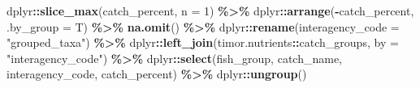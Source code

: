 \documentclass[
]{book}
\newenvironment{Shaded}{\begin{snugshade}}{\end{snugshade}}
\newcommand{\AttributeTok}[1]{\textcolor[rgb]{0.13,0.29,0.53}{#1}}
\newcommand{\DecValTok}[1]{\textcolor[rgb]{0.00,0.00,0.81}{#1}}
\newcommand{\FunctionTok}[1]{\textcolor[rgb]{0.13,0.29,0.53}{\textbf{#1}}}
\newcommand{\NormalTok}[1]{#1}
\newcommand{\SpecialCharTok}[1]{\textcolor[rgb]{0.81,0.36,0.00}{\textbf{#1}}}
\newcommand{\StringTok}[1]{\textcolor[rgb]{0.31,0.60,0.02}{#1}}
\begin{document}
\begin{Shaded}
\begin{Highlighting}[]
\NormalTok{  dplyr}\SpecialCharTok{::}\FunctionTok{slice\_max}\NormalTok{(catch\_percent, }\AttributeTok{n =} \DecValTok{1}\NormalTok{) }\SpecialCharTok{\%\textgreater{}\%}
\NormalTok{  dplyr}\SpecialCharTok{::}\FunctionTok{arrange}\NormalTok{(}\SpecialCharTok{{-}}\NormalTok{catch\_percent, }\AttributeTok{.by\_group =}\NormalTok{ T) }\SpecialCharTok{\%\textgreater{}\%}
  \FunctionTok{na.omit}\NormalTok{() }\SpecialCharTok{\%\textgreater{}\%}
\NormalTok{  dplyr}\SpecialCharTok{::}\FunctionTok{rename}\NormalTok{(}\AttributeTok{interagency\_code =} \StringTok{"grouped\_taxa"}\NormalTok{) }\SpecialCharTok{\%\textgreater{}\%}
\NormalTok{  dplyr}\SpecialCharTok{::}\FunctionTok{left\_join}\NormalTok{(timor.nutrients}\SpecialCharTok{::}\NormalTok{catch\_groups, }\AttributeTok{by =} \StringTok{"interagency\_code"}\NormalTok{) }\SpecialCharTok{\%\textgreater{}\%}
\NormalTok{  dplyr}\SpecialCharTok{::}\FunctionTok{select}\NormalTok{(fish\_group, catch\_name, interagency\_code, catch\_percent) }\SpecialCharTok{\%\textgreater{}\%}
\NormalTok{  dplyr}\SpecialCharTok{::}\FunctionTok{ungroup}\NormalTok{()}


\end{Highlighting}
\end{Shaded}
\end{document}
